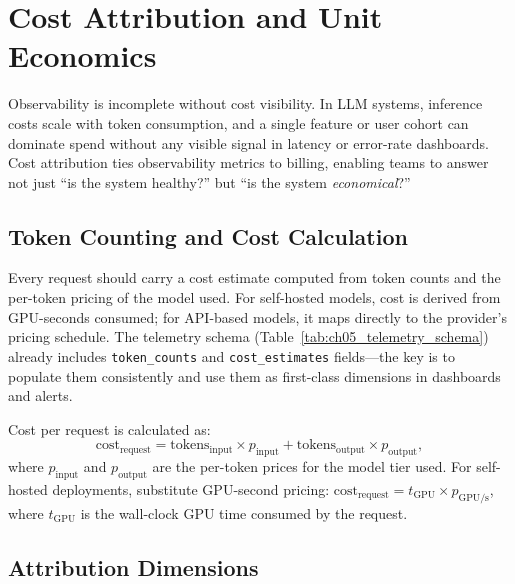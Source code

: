 
\section{Cost Attribution and Unit Economics}
\label{sec:ch05-cost-attribution}

Observability is incomplete without cost visibility. In LLM systems, inference costs scale with token consumption, and a single feature or user cohort can dominate spend without any visible signal in latency or error-rate dashboards. Cost attribution ties observability metrics to billing, enabling teams to answer not just ``is the system healthy?'' but ``is the system \emph{economical}?''

\subsection{Token Counting and Cost Calculation}
\label{subsec:ch05-token-cost-calc}

Every request should carry a cost estimate computed from token counts and the per-token pricing of the model used. For self-hosted models, cost is derived from GPU-seconds consumed; for API-based models, it maps directly to the provider's pricing schedule. The telemetry schema (Table~\ref{tab:ch05_telemetry_schema}) already includes \texttt{token\_counts} and \texttt{cost\_estimates} fields---the key is to populate them consistently and use them as first-class dimensions in dashboards and alerts.

Cost per request is calculated as:
\[
\text{cost}_{\text{request}} = \text{tokens}_{\text{input}} \times p_{\text{input}} + \text{tokens}_{\text{output}} \times p_{\text{output}},
\]
where $p_{\text{input}}$ and $p_{\text{output}}$ are the per-token prices for the model tier used. For self-hosted deployments, substitute GPU-second pricing: $\text{cost}_{\text{request}} = t_{\text{GPU}} \times p_{\text{GPU/s}}$, where $t_{\text{GPU}}$ is the wall-clock GPU time consumed by the request.

\subsection{Attribution Dimensions}
\label{subsec:ch05-attribution-dimensions}

